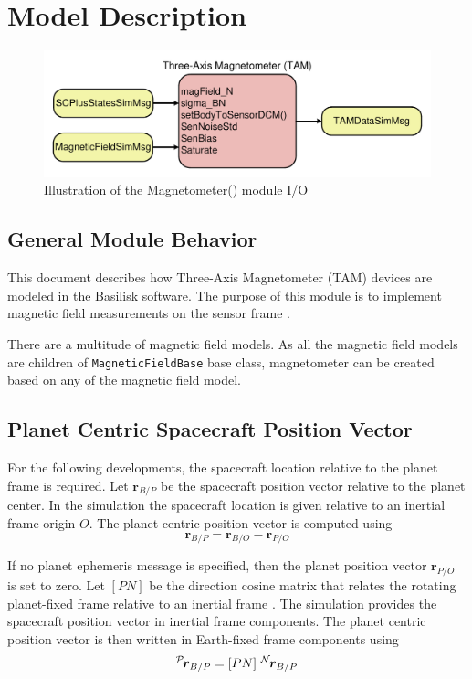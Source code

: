 
\section{Model Description}
\begin{figure}[htb]
	\centerline{
		\includegraphics[width=5.5in]{Figures/moduleDiagram}
	}
	\caption{Illustration of the Magnetometer() module I/O}
	\label{fig:moduleDiagram}
\end{figure}
\subsection{General Module Behavior}
This document describes how Three-Axis Magnetometer (TAM) devices are modeled in the Basilisk software.
The purpose of this module is to implement magnetic field measurements on the sensor frame . 

There are a multitude of magnetic field models. As all the magnetic field models are children of {\tt MagneticFieldBase} base class, magnetometer can be created based on any of the magnetic field model. 

\subsection{Planet Centric Spacecraft Position Vector}

For the following developments, the spacecraft location relative to the planet frame is required.  Let $\bm r_{B/P}$ be the spacecraft position vector relative to the planet center.  In the simulation the spacecraft location is given relative to an inertial frame origin $O$.  The planet centric position vector is computed using
\begin{equation}
	\bm r_{B/P} = \bm r_{B/O} - \bm r_{P/O}
\end{equation}

If no planet ephemeris message is specified, then the planet position vector $\bm r_{P/O}$ is set to zero. Let $[PN]$ be the direction cosine matrix\cite{schaub} that relates the rotating planet-fixed frame relative to an inertial frame .  The simulation provides the spacecraft position vector in inertial frame components.  The planet centric position vector is then written in Earth-fixed frame components using
\begin{equation}
	\leftexp{P}{\bm r}_{B/P} = [PN] \ \leftexp{N}{\bm r}_{B/P}
\end{equation}




